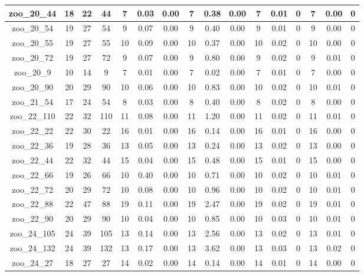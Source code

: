 \begin{landscape}
\begin{longtable}{|c|c|c|c|c|c|c|c|c|c|c|c|c|c|c|c|}
zoo\_20\_44 & 18 & 22 & 44 & 7 & 0.03 & 0.00 & 7 & 0.38 & 0.00 & 7 & 0.01 & 0 & 7 & 0.00 & 0 \\ \hline 
zoo\_20\_54 & 19 & 27 & 54 & 9 & 0.07 & 0.00 & 9 & 0.40 & 0.00 & 9 & 0.01 & 0 & 9 & 0.00 & 0 \\ \hline 
zoo\_20\_55 & 19 & 27 & 55 & 10 & 0.09 & 0.00 & 10 & 0.37 & 0.00 & 10 & 0.02 & 0 & 10 & 0.00 & 0 \\ \hline 
zoo\_20\_72 & 19 & 27 & 72 & 9 & 0.07 & 0.00 & 9 & 0.80 & 0.00 & 9 & 0.02 & 0 & 9 & 0.01 & 0 \\ \hline 
zoo\_20\_9 & 10 & 14 & 9 & 7 & 0.01 & 0.00 & 7 & 0.02 & 0.00 & 7 & 0.01 & 0 & 7 & 0.00 & 0 \\ \hline 
zoo\_20\_90 & 20 & 29 & 90 & 10 & 0.06 & 0.00 & 10 & 0.83 & 0.00 & 10 & 0.02 & 0 & 10 & 0.01 & 0 \\ \hline 
zoo\_21\_54 & 17 & 24 & 54 & 8 & 0.03 & 0.00 & 8 & 0.40 & 0.00 & 8 & 0.02 & 0 & 8 & 0.00 & 0 \\ \hline 
zoo\_22\_110 & 22 & 32 & 110 & 11 & 0.08 & 0.00 & 11 & 1.20 & 0.00 & 11 & 0.02 & 0 & 11 & 0.01 & 0 \\ \hline 
zoo\_22\_22 & 22 & 30 & 22 & 16 & 0.01 & 0.00 & 16 & 0.14 & 0.00 & 16 & 0.01 & 0 & 16 & 0.00 & 0 \\ \hline 
zoo\_22\_36 & 19 & 28 & 36 & 13 & 0.05 & 0.00 & 13 & 0.24 & 0.00 & 13 & 0.02 & 0 & 13 & 0.00 & 0 \\ \hline 
zoo\_22\_44 & 22 & 32 & 44 & 15 & 0.04 & 0.00 & 15 & 0.48 & 0.00 & 15 & 0.01 & 0 & 15 & 0.00 & 0 \\ \hline 
zoo\_22\_66 & 19 & 26 & 66 & 10 & 0.40 & 0.00 & 10 & 0.71 & 0.00 & 10 & 0.02 & 0 & 10 & 0.01 & 0 \\ \hline 
zoo\_22\_72 & 20 & 29 & 72 & 10 & 0.08 & 0.00 & 10 & 0.96 & 0.00 & 10 & 0.02 & 0 & 10 & 0.01 & 0 \\ \hline 
zoo\_22\_88 & 22 & 47 & 88 & 19 & 0.11 & 0.00 & 19 & 2.47 & 0.00 & 19 & 0.02 & 0 & 19 & 0.01 & 0 \\ \hline 
zoo\_22\_90 & 20 & 29 & 90 & 10 & 0.04 & 0.00 & 10 & 0.85 & 0.00 & 10 & 0.03 & 0 & 10 & 0.01 & 0 \\ \hline 
zoo\_24\_105 & 24 & 39 & 105 & 13 & 0.14 & 0.00 & 13 & 2.56 & 0.00 & 13 & 0.02 & 0 & 13 & 0.01 & 0 \\ \hline 
zoo\_24\_132 & 24 & 39 & 132 & 13 & 0.17 & 0.00 & 13 & 3.62 & 0.00 & 13 & 0.03 & 0 & 13 & 0.02 & 0 \\ \hline 
zoo\_24\_27 & 18 & 27 & 27 & 14 & 0.02 & 0.00 & 14 & 0.14 & 0.00 & 14 & 0.01 & 0 & 14 & 0.00 & 0 \\ \hline 

\end{longtable}
\end{landscape}
